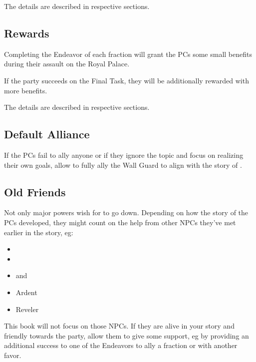 The details are described in respective sections.



\subsection{Rewards}

Completing the Endeavor of each fraction will grant the PCs some small benefits during their assault on the Royal Palace.

If the party succeeds on the Final Task, they will be additionally rewarded with more benefits.

The details are described in respective sections.


\subsection{Default Alliance}

If the PCs fail to ally anyone or if they ignore the topic and focus on realizing their own goals, allow \npcKaladin{} to fully ally the Wall Guard to align with the story of \bookOB{}.



\subsection{Old Friends}

Not only major powers wish for \npcQueen{} to go down. Depending on how the story of the PCs developed, they might count on the help from other NPCs they've met earlier in the story, eg:

\begin{itemize}
	\item \npcTroublemaker{}
	\item \npcGrandma{} \npcGrandmaName{}
	\item \npcSingerWorkerGranF{} and \npcSingerWorkerGranM{}
	\item Ardent \npcLockedArdent{}
	\item Reveler \npcRevelerGeneral{}
\end{itemize}

This book will not focus on those NPCs. If they are alive in your story and friendly towards the party, allow them to give some support, eg by providing an additional success to one of the Endeavors to ally a fraction or with another favor.
